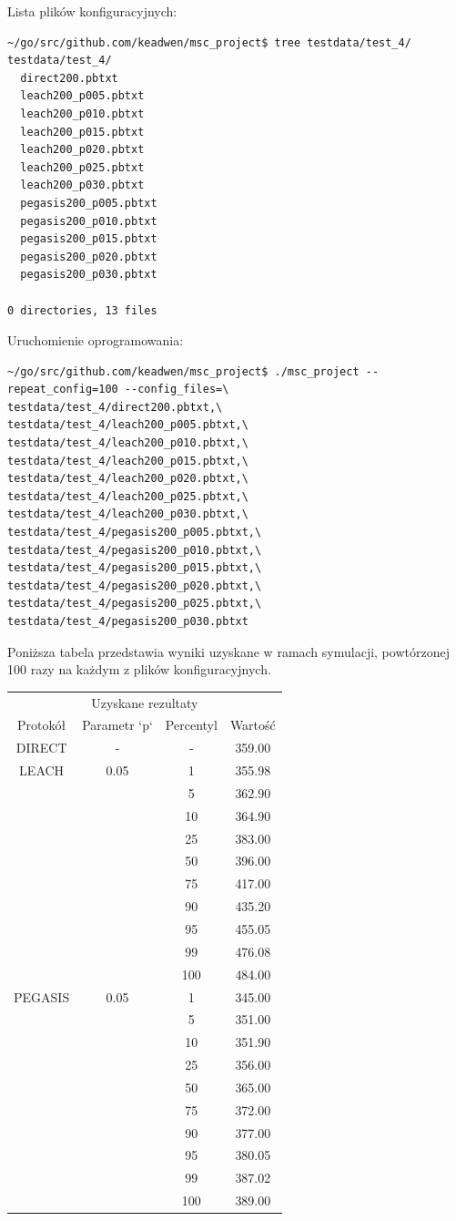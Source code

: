 \documentclass[a4paper,12pt,twoside,openany]{report}
\begin{document}
Lista plików konfiguracyjnych:

\begin{lstlisting}
~/go/src/github.com/keadwen/msc_project$ tree testdata/test_4/
testdata/test_4/
  direct200.pbtxt
  leach200_p005.pbtxt
  leach200_p010.pbtxt
  leach200_p015.pbtxt
  leach200_p020.pbtxt
  leach200_p025.pbtxt
  leach200_p030.pbtxt
  pegasis200_p005.pbtxt
  pegasis200_p010.pbtxt
  pegasis200_p015.pbtxt
  pegasis200_p020.pbtxt
  pegasis200_p030.pbtxt

0 directories, 13 files
\end{lstlisting}

Uruchomienie oprogramowania:

\begin{lstlisting}
~/go/src/github.com/keadwen/msc_project$ ./msc_project --repeat_config=100 --config_files=\
testdata/test_4/direct200.pbtxt,\
testdata/test_4/leach200_p005.pbtxt,\
testdata/test_4/leach200_p010.pbtxt,\
testdata/test_4/leach200_p015.pbtxt,\
testdata/test_4/leach200_p020.pbtxt,\
testdata/test_4/leach200_p025.pbtxt,\
testdata/test_4/leach200_p030.pbtxt,\
testdata/test_4/pegasis200_p005.pbtxt,\
testdata/test_4/pegasis200_p010.pbtxt,\
testdata/test_4/pegasis200_p015.pbtxt,\
testdata/test_4/pegasis200_p020.pbtxt,\
testdata/test_4/pegasis200_p025.pbtxt,\
testdata/test_4/pegasis200_p030.pbtxt
\end{lstlisting}

Poniższa tabela przedstawia wyniki uzyskane w ramach symulacji, powtórzonej 100 razy na każdym z plików konfiguracyjnych. 

\begin{longtable}{*{4}{c}}
\toprule
\multicolumn{4}{c}{Uzyskane rezultaty} \\
Protokół	& Parametr `p`	& Percentyl	& Wartość \\
\midrule
\endhead
DIRECT	& - 	& -	& 359.00 \\*
\midrule
LEACH	& 0.05	& 1	& 355.98 \\*
	&	& 5	& 362.90 \\*
	&	& 10	& 364.90 \\*
	&	& 25	& 383.00 \\*
	&	& 50	& 396.00 \\*
	&	& 75	& 417.00 \\*
	&	& 90	& 435.20 \\*
	&	& 95	& 455.05 \\*
	&	& 99	& 476.08 \\*
	&	& 100	& 484.00 \\*
\midrule
PEGASIS	& 0.05	& 1	& 345.00 \\*
	&	& 5	& 351.00 \\*
	&	& 10	& 351.90 \\*
	&	& 25	& 356.00 \\*
	&	& 50	& 365.00 \\*
	&	& 75	& 372.00 \\*
	&	& 90	& 377.00 \\*
	&	& 95	& 380.05 \\*
	&	& 99	& 387.02 \\*
	&	& 100	& 389.00 \\*
\bottomrule
\end{longtable}
\end{document}
